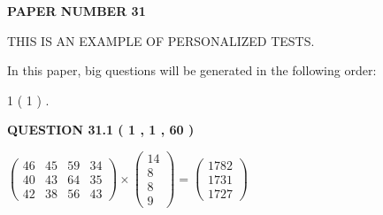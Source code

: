 \documentclass[12pt]{article}
\begin{document}
   
   
   
\newpage 
\setcounter{page}{ 
    31001 } 
   
   
   
   
 {\textbf{ \Large{ PAPER NUMBER           31  }}}
   
   
\vspace{0.2in}
   
   
   
   
   
   
 \vspace{0.2in}
{\Huge  THIS IS AN EXAMPLE OF}
{\Huge  PERSONALIZED TESTS. }
   
   
   
\vspace{0.2in}
   
In this paper, big questions will be generated in the following order: 
   
   
             1 (           1 )
 .
  
\vspace{0.2in}
  
{\textbf{\Large{QUESTION
31.1 
 (           1 ,           1 ,          60 )
}}}
  
  
 
 
\noindent{}

 
$\left( \begin{array}{ccccccccccccccc}
          46  & 
          45  & 
          59  & 
          34  \\ 
          40  & 
          43  & 
          64  & 
          35  \\ 
          42  & 
          38  & 
          56  & 
          43
\end{array}\right) \times
\left( \begin{array}{c}
          14  \\ 
           8  \\ 
           8  \\ 
           9
\end{array}\right)  =
\left( \begin{array}{c}
        1782  \\ 
        1731  \\ 
        1727
\end{array}\right)  $
 
\end{document}
